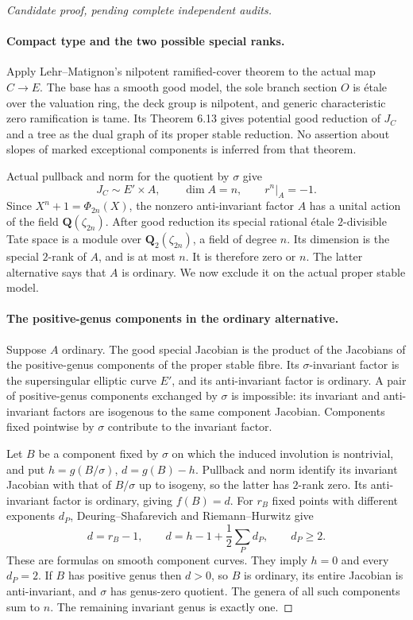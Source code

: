 \begin{proof}[Candidate proof, pending complete independent audits]
\paragraph{Compact type and the two possible special ranks.}
Apply Lehr--Matignon's nilpotent ramified-cover theorem to
the actual map \(C\to E\). The base has a smooth good model,
the sole branch section \(O\) is \'{e}tale over the valuation
ring, the deck group is nilpotent, and generic characteristic
zero ramification is tame. Its Theorem 6.13 gives potential
good reduction of \(J_C\) and a tree as the dual graph
of its proper stable reduction.
\cite[Theorem 6.13]{fghLehrMatignon2005}
\cite[p.662]{fghSaidi2007}
No assertion about slopes of marked exceptional components
is inferred from that theorem.

Actual pullback and norm for the quotient by \(\sigma\)
give
\[
 J_C\sim E'\times A,\qquad \dim A=n,\qquad
                     r^n|_A=-1.                       \tag{A.75.5}
\]
Since \(X^n+1=\Phi_{2n}(X)\), the nonzero anti-invariant
factor \(A\) has a unital action of the field
\(\mathbf Q(\zeta_{2n})\). After good reduction its special
rational \'{e}tale \(2\)-divisible Tate space is a module
over \(\mathbf Q_2(\zeta_{2n})\), a field of degree \(n\).
Its dimension is the special \(2\)-rank of \(A\), and
is at most \(n\). It is therefore zero or \(n\).
The latter alternative says that \(A\) is ordinary.
We now exclude it on the actual proper stable model.

\paragraph{The positive-genus components in the ordinary alternative.}
Suppose \(A\) ordinary. The good special Jacobian is the
product of the Jacobians of the positive-genus components
of the proper stable fibre. Its \(\sigma\)-invariant
factor is the supersingular elliptic curve \(E'\), and
its anti-invariant factor is ordinary. A pair of positive-genus
components exchanged by \(\sigma\) is impossible: its
invariant and anti-invariant factors are isogenous to the
same component Jacobian. Components fixed pointwise by
\(\sigma\) contribute to the invariant factor.

Let \(B\) be a component fixed by \(\sigma\) on which
the induced involution is nontrivial, and put
\(h=g(B/\sigma)\), \(d=g(B)-h\). Pullback and norm
identify its invariant Jacobian with that of \(B/\sigma\)
up to isogeny, so the latter has \(2\)-rank zero. Its
anti-invariant factor is ordinary, giving \(f(B)=d\).
For \(r_B\) fixed points with different exponents \(d_P\),
Deuring--Shafarevich and Riemann--Hurwitz give
\[
 d=r_B-1,\qquad
 d=h-1+\frac12\sum_P d_P,
                         \qquad d_P\ge2.             \tag{A.75.6}
\]
\cite[Corollary 1.8]{fghCrew1984}
\cite[Proposition 1.4]{fghYang2024}
These are formulas on smooth component curves. They imply
\(h=0\) and every \(d_P=2\). If \(B\) has positive
genus then \(d>0\), so \(B\) is ordinary, its entire
Jacobian is anti-invariant, and \(\sigma\) has genus-zero
quotient. The genera of all such components sum to \(n\).
The remaining invariant genus is exactly one.


\end{proof}

